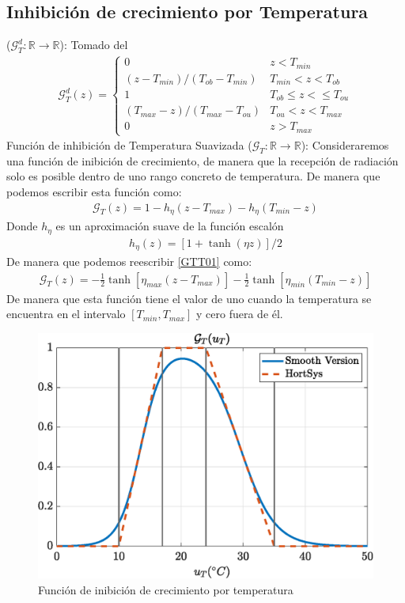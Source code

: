 \subsection{Inhibición de crecimiento por Temperatura} ($\mathcal{G}_T^d:\mathbb{R} \rightarrow \mathbb{R}$): Tomado del \cite{Martinez-Ruiz2019} 
\begin{gather}
    \mathcal{G}_T^d(z) = \begin{cases}
        0 & z<T_{min} \\
        (z-T_{min})/(T_{ob} - T_{min}) & T_{min} < z < T_{ob} \\
        1 & T_{ob} \leq z <\leq T_{ou} \\
        (T_{max}-z)/(T_{max}- T_{ou}) & T_{ou}< z < T_{max} \\
        0 & z>T_{max}
    \end{cases}
\end{gather}
{Función de inhibición de Temperatura Suavizada} ($\mathcal{G}_{T}:\mathbb{R} \rightarrow \mathbb{R}$): Consideraremos una función de inibición de crecimiento, de manera que la recepción de radiación solo es posible dentro de uno rango concreto de temperatura. De manera que podemos escribir esta función como:
\begin{gather}\label{GTT01}
    \mathcal{G}_{T}(z) = 
    1-h_{\eta}(z-T_{max})-h_{\eta}(T_{min}-z) 
\end{gather}
Donde $h_{\eta}$ es un aproximación suave de la función escalón
\begin{gather}
    h_{\eta}(z) = [1+\tanh(\eta z)]/2 
\end{gather}
De manera que podemos reescribir \eqref{GTT01} como:
\begin{gather}
    \mathcal{G}_{T}(z) = -\frac{1}{2} \tanh[\eta_{max}(z-T_{max})] - \frac{1}{2}\tanh[\eta_{min} (T_{min}-z)]
\end{gather} 
De manera que esta función tiene el valor de uno cuando la temperatura se encuentra en el intervalo $[T_{min},T_{max}]$ y cero fuera de él. 
\begin{figure}[ht!]
    \centering
    \includegraphics[scale=0.5]{img/uT_sm.eps}
    \caption{Función de inibición de crecimiento por temperatura}
\end{figure}